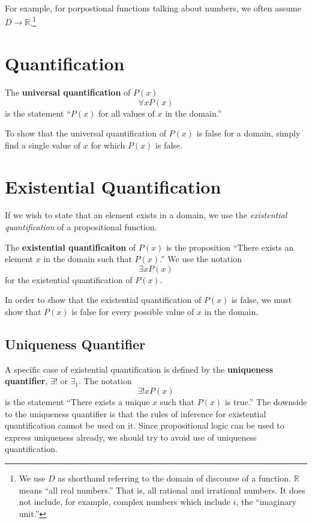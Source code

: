 For example, for porpostional functions talking about numbers, we often assume $D \to\mathbb{R}$.\footnote{We use $D$ as shorthand referring to the domain of discourse of a function.
$\mathbb{R}$ means ``all real numbers.'' That is, all rational and irrational numbers. It does not include, for example, complex numbers which include $i$, the ``imaginary unit.''}


\section{Quantification}

The \textbf{universal quantification} of $P(x)$
\begin{equation}
  \forall x P(x)
\end{equation}
is the statement
``$P(x)$ for all values of $x$ in the domain.''

To show that the universal quantification of $P(x)$ is false for a domain, simply find a single value of $x$ for which $P(x)$ is false.

\section{Existential Quantification}

If we wish to state that an element exists in a domain, we use the \emph{existential quantification} of a propositional function.

The \textbf{existential quantificaiton} of $P(x)$ is the proposition
  ``There exists an element $x$ in the domain such that $P(x)$.''
We use the notation \[\exists x P(x)\] for the existential quantification of $P(x)$.

\begin{note}
  In order to show that the existential quantification of $P(x)$ is false, we must
  show that $P(x)$ is false for every possible value of $x$ in the domain.
\end{note}


\subsection{Uniqueness Quantifier}
A specific case of existential quantification is defined by the
\textbf{uniqueness quantifier}, $\exists!$ or $\exists_1$. The notation
\[ \exists! x P(x) \]
is the statement ``There exists a unique $x$ such that $P(x)$ is true.'' The
downside to the uniqueness quantifier is that the rules of inference for
existential quantification cannot be used on it. Since propositional logic can
be used to express uniqueness already, we should try to avoid use of uniqueness
quantification.

